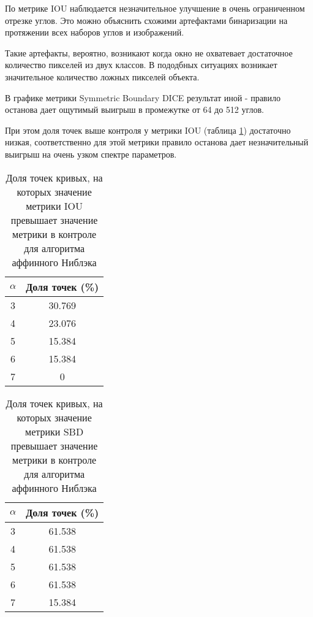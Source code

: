 По метрике IOU наблюдается незначительное улучшение в очень ограниченном отрезке углов. Это можно объяснить схожими артефактами бинаризации на протяжении всех наборов углов и изображений. 

Такие артефакты, вероятно, возникают когда окно не охватевает достаточное количество пикселей из двух классов. В пододбных ситуациях возникает значительное количество ложных пикселей объекта. 

В графике метрики Symmetric Boundary DICE результат иной - правило останова дает ощутимый выигрыш в промежутке от 64 до 512 углов. 

При этом доля точек выше контроля у метрики IOU (таблица \ref*{tab:niblackiou}) достаточно низкая, соответственно для этой метрики правило останова дает незначительный выигрыш на очень узком спектре параметров.



\begin{table}[H]
\centering
\caption{Доля точек кривых, на которых значение метрики IOU превышает значение метрики в  контроле для алгоритма аффинного Ниблэка}
\label{tab:niblackiou}
\begin{tabular}{|c|c|}
\hline
\(\alpha\) & Доля точек (\%) \\
\hline
3 & 30.769 \\
4 & 23.076 \\
5 & 15.384 \\
6 & 15.384 \\
7 &  0 \\
\hline
\end{tabular}
\end{table}

\begin{table}[H]
\centering
\caption{Доля точек кривых, на которых значение метрики SBD превышает значение метрики в  контроле для алгоритма аффинного Ниблэка}
\label{tab:niblacksbd}
\begin{tabular}{|c|c|}
\hline
\(\alpha\) & Доля точек (\%) \\
\hline
3 & 61.538 \\
4 & 61.538 \\
5 & 61.538 \\
6 & 61.538 \\
7 & 15.384 \\
\hline
\end{tabular}
\end{table}

